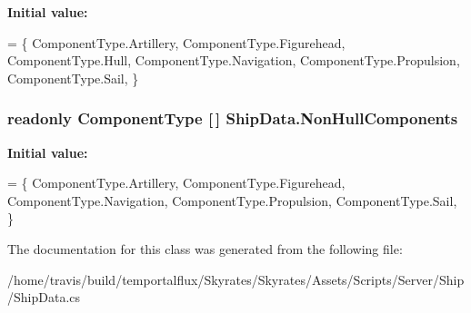 {\bfseries Initial value\-:}
\begin{DoxyCode}
=
    \{
        ComponentType.Artillery,
        ComponentType.Figurehead,
        ComponentType.Hull,
        ComponentType.Navigation,
        ComponentType.Propulsion,
        ComponentType.Sail,
    \}
\end{DoxyCode}
\hypertarget{class_ship_data_a5ef95366640e8dc06cb884368a8e41a2}{
\subsubsection[{Non\-Hull\-Components}]{\setlength{\rightskip}{0pt plus 5cm}readonly Component\-Type \mbox{[}$\,$\mbox{]} Ship\-Data.\-Non\-Hull\-Components\hspace{0.3cm}{\ttfamily [static]}}}\label{class_ship_data_a5ef95366640e8dc06cb884368a8e41a2}
{\bfseries Initial value\-:}
\begin{DoxyCode}
= \{
        ComponentType.Artillery,
        ComponentType.Figurehead,
        ComponentType.Navigation,
        ComponentType.Propulsion,
        ComponentType.Sail,
    \}
\end{DoxyCode}


The documentation for this class was generated from the following file\-:\begin{DoxyCompactItemize}
\item 
/home/travis/build/temportalflux/\-Skyrates/\-Skyrates/\-Assets/\-Scripts/\-Server/\-Ship/Ship\-Data.\-cs\end{DoxyCompactItemize}
